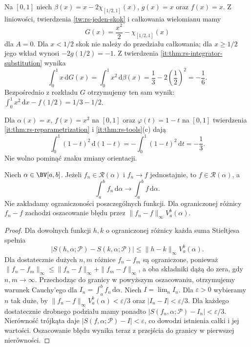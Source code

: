 \begin{przyklad}\label{it:ex:rs-substitution-atom}
Na $[0,1]$ niech $\beta(x)=x-2\chi_{[1/2,1]}(x)$,
$g(x)=x$ oraz $f(x)=x$. Z liniowości, twierdzenia
\ref{tw:rs-jeden-skok} i całkowania wielomianu mamy
\[
 G(x)=\frac{x^2}{2}-\chi_{[1/2,1]}(x)
\]
dla $A=0$. Dla $x<1/2$ skok nie należy do przedziału całkowania;
dla $x\ge1/2$ jego wkład wynosi $-2g(1/2)=-1$.
Z twierdzenia \ref{it:thm:rs-integrator-substitution} wynika
\[
 \int_0^1 x\,\mathrm dG(x)
 =\int_0^1 x^2\,\mathrm d\beta(x)
 =\frac13-2\left(\frac12\right)^2=-\frac16.
\]
Bezpośrednio z rozkładu $G$ otrzymujemy ten sam wynik:
$\int_0^1 x^2\,\mathrm dx-f(1/2)=1/3-1/2$.
\end{przyklad}

\begin{przyklad}\label{it:ex:rs-substitution-reverse}
Dla $\alpha(x)=x$, $f(x)=x^2$ na $[0,1]$ oraz
$\varphi(t)=1-t$ na $[0,1]$ twierdzenia
\ref{it:thm:rs-reparametrization} i \ref{it:thm:rs-tools}(c) dają
\[
 \int_0^1(1-t)^2\,\mathrm d(1-t)
 =-\int_0^1(1-t)^2\,\mathrm dt=-\frac13.
\]
Nie wolno pominąć znaku zmiany orientacji.
\end{przyklad}

\begin{twierdzenie}\label{ma1:kh:thm:rs-uniform}
Niech $\alpha\in\BV[a,b]$. Jeżeli $f_n\in\mathcal R(\alpha)$ i $f_n\to f$ jednostajnie, to $f\in\mathcal R(\alpha)$, a
\[
 \int_a^b f_n\,\mathrm d\alpha\longrightarrow\int_a^b f\,\mathrm d\alpha.
\]
Nie zakładamy ograniczoności poszczególnych funkcji. Dla ograniczonej różnicy $f_n-f$ zachodzi oszacowanie błędu przez $\|f_n-f\|_\infty V_a^b(\alpha)$.
\end{twierdzenie}
\begin{proof}
Dla dowolnych funkcji $h,k$ o ograniczonej różnicy każda suma Stieltjesa spełnia
\[
 |S(h,\alpha;\mathcal P)-S(k,\alpha;\mathcal P)|
 \le\|h-k\|_\infty V_a^b(\alpha).
\]
Dla dostatecznie dużych $n,m$ różnice $f_n-f_m$ są ograniczone, ponieważ $\|f_n-f_m\|_\infty\le\|f_n-f\|_\infty+\|f_m-f\|_\infty$, a oba składniki dążą do zera, gdy $n,m\to\infty$. Przechodząc do granicy w powyższym oszacowaniu, otrzymujemy warunek Cauchy'ego dla $I_n=\int_a^b f_n\,\mathrm d\alpha$. Niech $I=\lim_n I_n$. Dla $\varepsilon>0$ wybieramy $n$ tak duże, by $\|f_n-f\|_\infty V_a^b(\alpha)<\varepsilon/3$ oraz $|I_n-I|<\varepsilon/3$. Dla każdego dostatecznie drobnego podziału mamy ponadto $|S(f_n,\alpha;\mathcal P)-I_n|<\varepsilon/3$. Nierówność trójkąta daje $|S(f,\alpha;\mathcal P)-I|<\varepsilon$, co dowodzi istnienia całki i jej wartości. Oszacowanie błędu wynika teraz z przejścia do granicy w pierwszej nierówności.
\end{proof}

